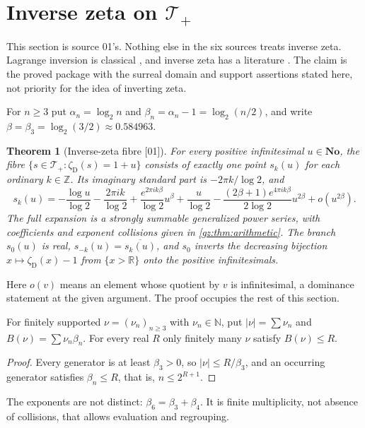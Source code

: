\documentclass[11pt,a4paper]{article}
\numberwithin{equation}{section}
\newtheorem{theorem}{Theorem}[section]
\theoremstyle{definition}
\theoremstyle{remark}
\newcommand{\No}{\mathbf{No}}
\newcommand{\R}{\mathbb R}
\newcommand{\Z}{\mathbb Z}
\newcommand{\N}{\mathbb N}
\newcommand{\zD}{\zeta_{\mathrm D}}
\newcommand{\Tp}{\mathcal T_{+}}
\newcommand{\src}[1]{\textup{[#1]}}
\begin{document}
\section{Inverse zeta on \texorpdfstring{$\Tp$}{T+}}\label{gz:sec:inverse}

This section is source 01's. Nothing else in the six sources treats inverse
zeta. Lagrange inversion is classical \cite{Gessel}, and inverse zeta has a
literature \cite{Kawalec}. The claim is the proved package with the
surreal domain and support assertions stated here, not priority for the
idea of inverting zeta.

For $n\ge3$ put $\alpha_n=\log_2n$ and $\beta_n=\alpha_n-1=\log_2(n/2)$, and
write $\beta=\beta_3=\log_2(3/2)\approx0.584963$.

\begin{theorem}[Inverse-zeta fibre \src{01}]\label{gz:thm:headline}
For every positive infinitesimal $u\in\No$, the fibre
$\{s\in\Tp:\zD(s)=1+u\}$ consists of exactly one point $s_k(u)$ for each
ordinary $k\in\Z$. Its imaginary standard part is $-2\pi k/\log2$, and
\[
s_k(u)=-\frac{\log u}{\log2}-\frac{2\pi ik}{\log2}+\frac{e^{2\pi ik\beta}}{\log2}u^\beta+\frac u{\log2}-\frac{(2\beta+1)e^{4\pi ik\beta}}{2\log2}u^{2\beta}+o(u^{2\beta}).
\]
The full expansion is a strongly summable generalized power series, with
coefficients and exponent collisions given in \cref{gz:thm:arithmetic}. The
branch $s_0(u)$ is real, $s_{-k}(u)=\overline{s_k(u)}$, and $s_0$ inverts the
decreasing bijection $x\mapsto\zD(x)-1$ from $\{x>\R\}$ onto the positive
infinitesimals.
\end{theorem}
Here $o(v)$ means an element whose quotient by $v$ is infinitesimal, a
dominance statement at the given argument. The proof occupies the rest of
this section.

\begin{lemma}[The weight monoid \src{01}]\label{gz:lem:weightmonoid}
For finitely supported $\nu=(\nu_n)_{n\ge3}$ with $\nu_n\in\N$, put
$|\nu|=\sum\nu_n$ and $B(\nu)=\sum\nu_n\beta_n$. For every real $R$ only
finitely many $\nu$ satisfy $B(\nu)\le R$.
\end{lemma}
\begin{proof}
Every generator is at least $\beta_3>0$, so $|\nu|\le R/\beta_3$, and an
occurring generator satisfies $\beta_n\le R$, that is, $n\le2^{R+1}$.
\end{proof}
The exponents are not distinct: $\beta_6=\beta_3+\beta_4$. It is finite
multiplicity, not absence of collisions, that allows evaluation and
regrouping.
\end{document}
